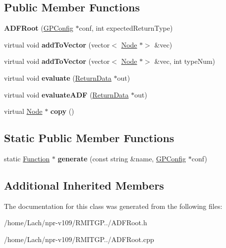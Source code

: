 \subsection*{Public Member Functions}
\begin{DoxyCompactItemize}
\item 
\hypertarget{classADFRoot_acde583cf9fe46ce521fcf856d3d4cc19}{}\label{classADFRoot_acde583cf9fe46ce521fcf856d3d4cc19} 
{\bfseries A\+D\+F\+Root} (\hyperlink{classGPConfig}{G\+P\+Config} $\ast$conf, int expected\+Return\+Type)
\item 
\hypertarget{classADFRoot_a50591f5fb63f6718e4a60fe24088c48f}{}\label{classADFRoot_a50591f5fb63f6718e4a60fe24088c48f} 
virtual void {\bfseries add\+To\+Vector} (vector$<$ \hyperlink{classNode}{Node} $\ast$$>$ \&vec)
\item 
\hypertarget{classADFRoot_acaffcb943d4f8a19bc679ee5534ffef3}{}\label{classADFRoot_acaffcb943d4f8a19bc679ee5534ffef3} 
virtual void {\bfseries add\+To\+Vector} (vector$<$ \hyperlink{classNode}{Node} $\ast$$>$ \&vec, int type\+Num)
\item 
\hypertarget{classADFRoot_a617d8b451f6b51f10270921ed2073f81}{}\label{classADFRoot_a617d8b451f6b51f10270921ed2073f81} 
virtual void {\bfseries evaluate} (\hyperlink{classReturnData}{Return\+Data} $\ast$out)
\item 
\hypertarget{classADFRoot_af88ef44b4fca614032d83981a5886ceb}{}\label{classADFRoot_af88ef44b4fca614032d83981a5886ceb} 
virtual void {\bfseries evaluate\+A\+DF} (\hyperlink{classReturnData}{Return\+Data} $\ast$out)
\item 
\hypertarget{classADFRoot_a7f76896e68d8004c8699b724af0fa9b1}{}\label{classADFRoot_a7f76896e68d8004c8699b724af0fa9b1} 
virtual \hyperlink{classNode}{Node} $\ast$ {\bfseries copy} ()
\end{DoxyCompactItemize}
\subsection*{Static Public Member Functions}
\begin{DoxyCompactItemize}
\item 
\hypertarget{classADFRoot_a1d825b0d257b308ed9b81f4d7ab4aa51}{}\label{classADFRoot_a1d825b0d257b308ed9b81f4d7ab4aa51} 
static \hyperlink{classFunction}{Function} $\ast$ {\bfseries generate} (const string \&name, \hyperlink{classGPConfig}{G\+P\+Config} $\ast$conf)
\end{DoxyCompactItemize}
\subsection*{Additional Inherited Members}


The documentation for this class was generated from the following files\+:\begin{DoxyCompactItemize}
\item 
/home/\+Lach/npr-\/v109/\+R\+M\+I\+T\+G\+P../A\+D\+F\+Root.\+h\item 
/home/\+Lach/npr-\/v109/\+R\+M\+I\+T\+G\+P../A\+D\+F\+Root.\+cpp\end{DoxyCompactItemize}
